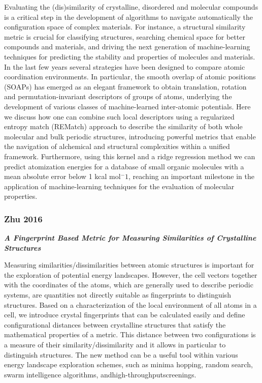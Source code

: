 \documentclass[11pt]{article}
\begin{document}
Evaluating the (dis)similarity of crystalline, disordered and molecular
compounds is a critical step in the development of algorithms to
navigate automatically the configuration space of complex materials. For
instance, a structural similarity metric is crucial for classifying
structures, searching chemical space for better compounds and materials,
and driving the next generation of machine-learning techniques for
predicting the stability and properties of molecules and materials. In
the last few years several strategies have been designed to compare
atomic coordination environments. In particular, the smooth overlap of
atomic positions (SOAPs) has emerged as an elegant framework to obtain
translation, rotation and permutation-invariant descriptors of groups of
atoms, underlying the development of various classes of machine-learned
inter-atomic potentials. Here we discuss how one can combine such local
descriptors using a regularized entropy match (REMatch) approach to
describe the similarity of both whole molecular and bulk periodic
structures, introducing powerful metrics that enable the navigation of
alchemical and structural complexities within a unified framework.
Furthermore, using this kernel and a ridge regression method we can
predict atomization energies for a database of small organic molecules
with a mean absolute error below 1 kcal mol\(^-1\), reaching an
important milestone in the application of machine-learning techniques
for the evaluation of molecular properties.

    \subsubsection{Zhu 2016}\label{zhu-2016}

\textbf{\emph{A Fingerprint Based Metric for Measuring Similarities of
Crystalline Structures}}

Measuring similarities/dissimilarities between atomic structures is
important for the exploration of potential energy landscapes. However,
the cell vectors together with the coordinates of the atoms, which are
generally used to describe periodic systems, are quantities not directly
suitable as fingerprints to distinguish structures. Based on a
characterization of the local environment of all atoms in a cell, we
introduce crystal fingerprints that can be calculated easily and define
configurational distances between crystalline structures that satisfy
the mathematical properties of a metric. This distance between two
configurations is a measure of their similarity/dissimilarity and it
allows in particular to distinguish structures. The new method can be a
useful tool within various energy landscape exploration schemes, such as
minima hopping, random search, swarm intelligence algorithms,
andhigh-throughputscreenings.
\end{document}
